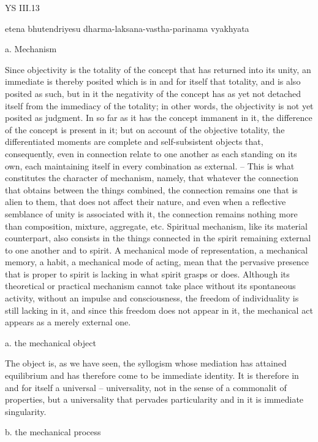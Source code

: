 YS III.13

etena bhutendriyesu dharma-laksana-vastha-parinama vyakhyata

a. Mechanism

Since objectivity is the totality of the concept that has returned into its
unity, an immediate is thereby posited which is in and for itself that
totality, and is also posited as such, but in it the negativity of the concept
has as yet not detached itself from the immediacy of the totality; in other
words, the objectivity is not yet posited as judgment. In so far as it has
the concept immanent in it, the difference of the concept is present in it;
but on account of the objective totality, the differentiated moments are
complete and self-subsistent objects that, consequently, even in connection
relate to one another as each standing on its own, each maintaining itself
in every combination as external. – This is what constitutes the character
of mechanism, namely, that whatever the connection that obtains between
the things combined, the connection remains one that is alien to them,
that does not affect their nature, and even when a reflective semblance
of unity is associated with it, the connection remains nothing more than
composition, mixture, aggregate, etc. Spiritual mechanism, like its material
counterpart, also consists in the things connected in the spirit remaining
external to one another and to spirit. A mechanical mode of representation,
a mechanical memory, a habit, a mechanical mode of acting, mean that the
pervasive presence that is proper to spirit is lacking in what spirit grasps
or does. Although its theoretical or practical mechanism cannot take place
without its spontaneous activity, without an impulse and consciousness,
the freedom of individuality is still lacking in it, and since this freedom
does not appear in it, the mechanical act appears as a merely external
one.

a. the mechanical object

The object is, as we have seen, the syllogism whose mediation has attained
equilibrium and has therefore come to be immediate identity. It is therefore
in and for itself a universal – universality, not in the sense of a commonalit
of properties, but a universality that pervades particularity and in it is
immediate singularity.

b. the mechanical process

